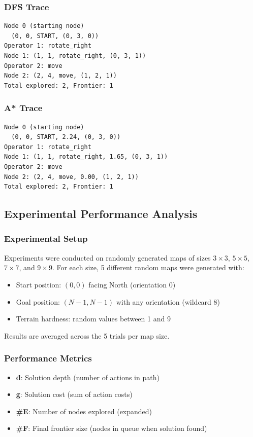 \documentclass[11pt,a4paper]{article}
\begin{document}
\subsubsection{DFS Trace}
\begin{lstlisting}[basicstyle=\ttfamily\tiny]
Node 0 (starting node)
  (0, 0, START, (0, 3, 0))
Operator 1: rotate_right
Node 1: (1, 1, rotate_right, (0, 3, 1))
Operator 2: move
Node 2: (2, 4, move, (1, 2, 1))
Total explored: 2, Frontier: 1
\end{lstlisting}

\subsubsection{A* Trace}
\begin{lstlisting}[basicstyle=\ttfamily\tiny]
Node 0 (starting node)
  (0, 0, START, 2.24, (0, 3, 0))
Operator 1: rotate_right
Node 1: (1, 1, rotate_right, 1.65, (0, 3, 1))
Operator 2: move
Node 2: (2, 4, move, 0.00, (1, 2, 1))
Total explored: 2, Frontier: 1
\end{lstlisting}

\subsection{Experimental Performance Analysis}

\subsubsection{Experimental Setup}
Experiments were conducted on randomly generated maps of sizes $3\times3$, $5\times5$, $7\times7$, and $9\times9$. For each size, 5 different random maps were generated with:
\begin{itemize}[leftmargin=1.5cm,itemsep=0.1em]
    \item Start position: $(0, 0)$ facing North (orientation 0)
    \item Goal position: $(N-1, N-1)$ with any orientation (wildcard 8)
    \item Terrain hardness: random values between 1 and 9
\end{itemize}

\noindent Results are averaged across the 5 trials per map size.

\subsubsection{Performance Metrics}
\begin{itemize}[leftmargin=1.5cm,itemsep=0.1em]
    \item \textbf{d}: Solution depth (number of actions in path)
    \item \textbf{g}: Solution cost (sum of action costs)
    \item \textbf{\#E}: Number of nodes explored (expanded)
    \item \textbf{\#F}: Final frontier size (nodes in queue when solution found)
\end{itemize}
\end{document}
